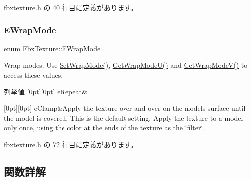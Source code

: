  fbxtexture.\+h の 40 行目に定義があります。

\mbox{\label{class_fbx_texture_ae273dffe3ff532dfd57e7bdb15b121fd}} 
\subsubsection{\texorpdfstring{E\+Wrap\+Mode}{EWrapMode}}
{\footnotesize\ttfamily enum \hyperlink{class_fbx_texture_ae273dffe3ff532dfd57e7bdb15b121fd}{Fbx\+Texture\+::\+E\+Wrap\+Mode}}

Wrap modes. Use \hyperlink{class_fbx_texture_afb9383ff8cc503b4446247ccdd634ef1}{Set\+Wrap\+Mode()}, \hyperlink{class_fbx_texture_a4df1c01895bf8fb995a5c031de7b77fe}{Get\+Wrap\+Mode\+U()} and \hyperlink{class_fbx_texture_abf31cda728e2ff7f94e10dca19de19d2}{Get\+Wrap\+Mode\+V()} to access these values. \begin{DoxyEnumFields}{列挙値}
[0pt][0pt]{}\mbox{\label{class_fbx_texture_ae273dffe3ff532dfd57e7bdb15b121fda1f253ce288cfae570e2d73d3ee432da8}} 
e\+Repeat&\\
\hline

[0pt][0pt]{}\mbox{\label{class_fbx_texture_ae273dffe3ff532dfd57e7bdb15b121fdac554ea44b46f77162f189cf6d6de7183}} 
e\+Clamp&Apply the texture over and over on the model\textquotesingle{}s surface until the model is covered. This is the default setting. Apply the texture to a model only once, using the color at the ends of the texture as the \char`\"{}filter\char`\"{}. \\
\hline

\end{DoxyEnumFields}


 fbxtexture.\+h の 72 行目に定義があります。



\subsection{関数詳解}
\mbox{\label{class_fbx_texture_afc81141345bc807a77dcbd9d6a0d8356}} 
